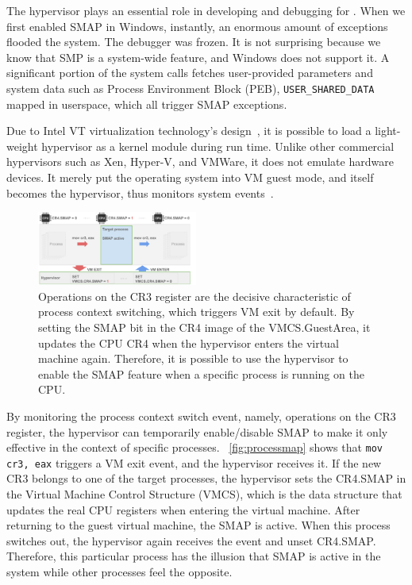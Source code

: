 The hypervisor plays an essential role in developing and debugging for \name. When we first enabled SMAP in Windows, instantly, an enormous amount of exceptions flooded the system. The debugger was frozen.  It is not surprising because we know that SMP is a system-wide feature, and Windows does not support it. A significant portion of the system calls fetches user-provided parameters and system data such as Process Environment Block (PEB), \texttt{USER\_SHARED\_DATA} mapped in userspace, which all trigger SMAP exceptions.

Due to Intel VT virtualization technology's design~\cite{neiger2006intel}, it is possible to load a light-weight hypervisor as a kernel module during run time. Unlike other commercial hypervisors such as Xen, Hyper-V, and VMWare, it does not emulate hardware devices. It merely put the operating system into VM guest mode, and itself becomes the hypervisor, thus monitors system events~\cite{howtohide}.

\begin{figure}[th]
  \includegraphics[width=0.47\textwidth]{figures/processmap4}
  \centering
  \caption{Operations on the CR3 register are the decisive characteristic of process context switching, which triggers VM exit by default. By setting the SMAP bit in the CR4 image of the VMCS.GuestArea, it updates the CPU CR4 when the hypervisor enters the virtual machine again. Therefore, it is possible to use the hypervisor to enable the SMAP feature when a specific process is running on the CPU.}
  \label{fig:processmap}
\end{figure}


By monitoring the process context switch event, namely, operations on the CR3 register, the hypervisor can temporarily enable/disable SMAP to make it only effective in the context of specific processes. ~\autoref{fig:processmap} shows that \texttt{mov cr3, eax} triggers a VM exit event, and the hypervisor receives it. If the new CR3 belongs to one of the target processes, the hypervisor sets the CR4.SMAP in the Virtual Machine Control Structure (VMCS), which is the data structure that updates the real CPU registers when entering the virtual machine. After returning to the guest virtual machine, the SMAP is active. When this process switches out, the hypervisor again receives the event and unset CR4.SMAP. Therefore, this particular process has the illusion that SMAP is active in the system while other processes feel the opposite.


